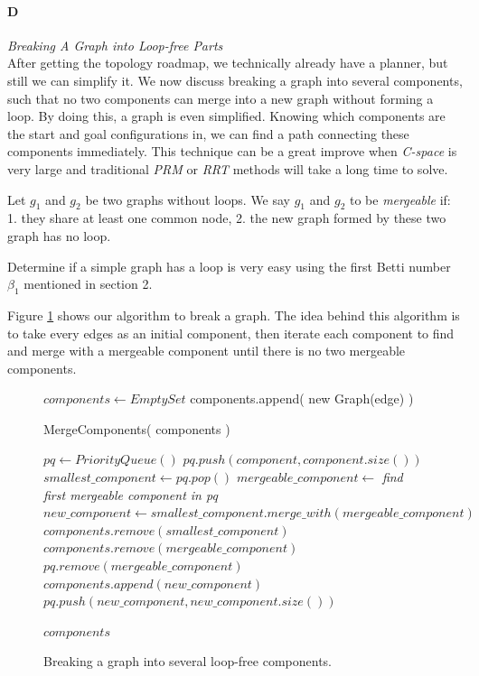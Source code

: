 \documentclass[11pt]{article}
\begin{document}
\paragraph{D} \emph{Breaking A Graph into Loop-free Parts} \hfill\\
\indent After getting the topology roadmap, we technically already have a planner, but still we can simplify it. We now discuss breaking a graph into several components, such that no two components can merge into a new graph without forming a loop. By doing this, a graph is even simplified. Knowing which components are the start and goal configurations in, we can find a path connecting these components immediately. This technique can be a great improve when \emph{C-space} is very large and traditional \emph{PRM} or \emph{RRT} methods will take a long time to solve.

\indent Let $g_1$ and $g_2$ be two graphs without loops. We say $g_1$ and $g_2$ to be \emph{mergeable} if: 1. they share at least one common node, 2. the new graph formed by these two graph has no loop. 

\indent Determine if a simple graph has a loop is very easy using the first Betti number $\beta_1$ mentioned in section 2. 

\indent Figure \ref{breakgraph} shows our algorithm to break a graph. The idea behind this algorithm is to take every edges as an initial component, then iterate each component to find and merge with a mergeable component until there is no two mergeable components.

\begin{figure}
\begin{algorithmic}[1] 
  	\State $components \gets EmptySet$
  		\State components.append( new Graph(edge) )
  	\EndFor
  	
  	\State \Return MergeComponents( components )
  \EndFunction
\end{algorithmic}


\begin{algorithmic}[1]   
  	\State $pq \gets PriorityQueue()$
        \State $pq.push(component, component.size())$
    \EndFor
    	\State $smallest\_component \gets pq.pop()$
    	\State $mergeable\_component \gets$ \emph{find first mergeable component in pq}
		\State $new\_component \gets smallest\_component.merge\_with( mergeable\_component )$
    	\State $components.remove( smallest\_component )$
    	\State $components.remove( mergeable\_component )$
    	\State $pq.remove( mergeable\_component )$
    	\State $components.append( new\_component )$
    	\State $pq.push(new\_component, new\_component.size())$
	\EndWhile
	
    \State \Return $components$
  \EndFunction  
\end{algorithmic}
	\caption{\label{breakgraph}} Breaking a graph into several loop-free components.
\end{figure}
\end{document}
